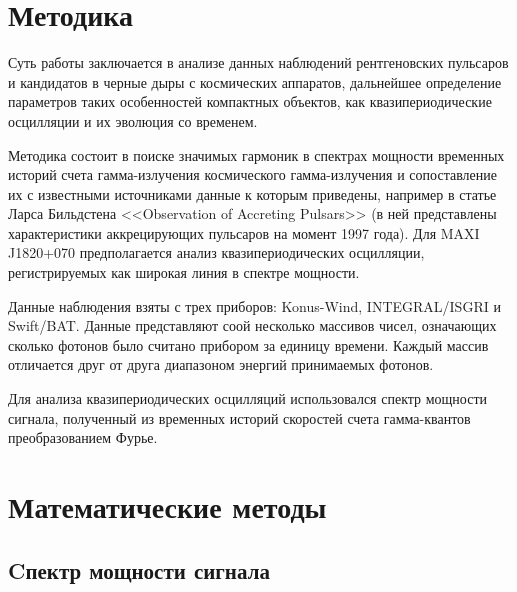 \section{Методика}

	Суть работы заключается в анализе данных наблюдений рентгеновских пульсаров и кандидатов в черные дыры с космических аппаратов, дальнейшее определение параметров таких особенностей компактных объектов, как квазипериодические осцилляции и их эволюция со временем.

	Методика состоит в поиске значимых гармоник в спектрах мощности временных историй счета гамма-излучения космического гамма-излучения и сопоставление их с известными источниками данные к которым приведены, например в статье Ларса Бильдстена <<Observation of Accreting Pulsars>> (в ней представлены характеристики аккрецирующих пульсаров на момент 1997 года). Для MAXI J1820+070 предполагается анализ квазипериодических осцилляции, регистрируемых как широкая линия в спектре мощности.
	
	Данные наблюдения взяты с трех приборов: Konus-Wind, INTEGRAL/ISGRI и Swift/BAT. Данные представляют соой несколько массивов чисел, означающих сколько фотонов было считано прибором за единицу времени. Каждый массив отличается друг от друга диапазоном энергий принимаемых фотонов.
	
	Для анализа квазипериодических осцилляций использовался спектр мощности сигнала, полученный из временных историй скоростей счета гамма-квантов преобразованием Фурье.
	
\section{Математические методы}
	
	\subsection{Cпектр мощности сигнала}
		
		

